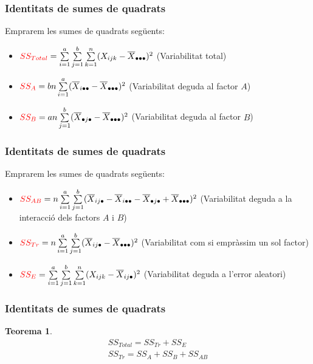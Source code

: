 \documentclass[12pt,t]{beamer}
\newcommand{\red}[1]{\textcolor{red}{#1}}
\theoremstyle{plain}
\newtheorem{teorema}{Teorema}
\theoremstyle{definition}
\begin{document}
\begin{frame}
\frametitle{Identitats de sumes de quadrats}

Emprarem les sumes de quadrats següents:
\begin{itemize}
\item $\red{SS_{Total}} =
\sum\limits_{i=1}^a\sum\limits_{j=1}^b\sum\limits_{k=1}^n
(X_{ijk}-\overline{X}_{\bullet\bullet\bullet})^2$ (Variabilitat total)
\medskip

\item  $\red{SS_A} =b n\sum\limits_{i=1}^a
(\overline{X}_{i\bullet\bullet}-\overline{X}_{\bullet\bullet\bullet})^2$
(Variabilitat deguda al
factor $A$)
\medskip

\item  $\red{SS_B} =a n\sum\limits_{j=1}^b (\overline{X}_{\bullet
j\bullet}-\overline{X}_{\bullet\bullet\bullet})^2$ (Variabilitat deguda al
factor $B$)
\end{itemize}


\end{frame}


\begin{frame}
\frametitle{Identitats de sumes de quadrats}

Emprarem les sumes de quadrats següents:
\begin{itemize}

\item $\red{SS_{AB}}=n \sum\limits_{i=1}^a\sum\limits_{j=1}^b
(\overline{X}_{ij\bullet}-\overline{X}_{i\bullet\bullet}-\overline{X}_{\bullet
j\bullet}+\overline{X}_{\bullet\bullet\bullet})^2$ (Variabilitat deguda a la interacció dels factors $A$
i $B$)
\medskip


\item $\red{SS_{Tr}}=n\sum\limits_{i=1}^a\sum\limits_{j=1}^b
(\overline{X}_{ij\bullet}-\overline{X}_{\bullet\bullet\bullet})^2$ (Variabilitat com si empràssim un sol factor)
\medskip


\item $\red{SS_E} =
\sum\limits_{i=1}^a\sum\limits_{j=1}^b\sum\limits_{k=1}^n
(X_{ijk}-\overline{X}_{ij\bullet})^2$ (Variabilitat deguda a l'error aleatori)
\end{itemize}

\end{frame}


\begin{frame}
\frametitle{Identitats de sumes de quadrats}

\begin{teorema}
$$
\begin{array}{l}
SS_{Total} = SS_{Tr}+SS_E\\[1ex]
SS_{Tr} = SS_A+SS_B+SS_{AB}
\end{array}
$$
\end{teorema}
\end{frame}
\end{document}
